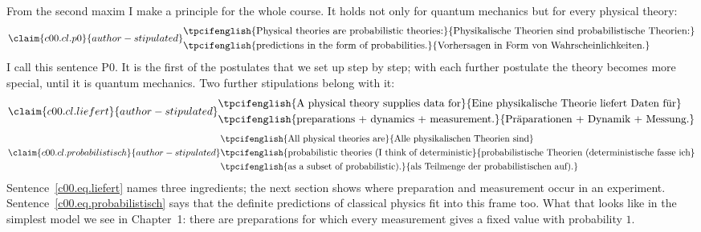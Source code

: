 From the second maxim I make a principle for the whole course. It holds not only for quantum
mechanics but for every physical theory:
\begin{equation}\label{c00.eq.p0}\claim{c00.cl.p0}{author-stipulated}
  \begin{aligned}
    &\text{\tpcifenglish{Physical theories are probabilistic theories:}{Physikalische Theorien sind probabilistische Theorien:}} \\
    &\text{\tpcifenglish{predictions in the form of probabilities.}{Vorhersagen in Form von Wahrscheinlichkeiten.}}
  \end{aligned}
\end{equation}
I call this sentence P0. It is the first of the postulates that we set up step by step; with
each further postulate the theory becomes more special, until it is quantum mechanics. Two
further stipulations belong with it:
\begin{equation}\label{c00.eq.liefert}\claim{c00.cl.liefert}{author-stipulated}
  \begin{aligned}
    &\text{\tpcifenglish{A physical theory supplies data for}{Eine physikalische Theorie liefert Daten für}} \\
    &\text{\tpcifenglish{preparations + dynamics + measurement.}{Präparationen + Dynamik + Messung.}}
  \end{aligned}
\end{equation}
\begin{equation}\label{c00.eq.probabilistisch}\claim{c00.cl.probabilistisch}{author-stipulated}
  \begin{aligned}
    &\text{\tpcifenglish{All physical theories are}{Alle physikalischen Theorien sind}} \\
    &\text{\tpcifenglish{probabilistic theories (I think of deterministic}{probabilistische Theorien (deterministische fasse ich}} \\
    &\text{\tpcifenglish{as a subset of probabilistic).}{als Teilmenge der probabilistischen auf).}}
  \end{aligned}
\end{equation}
Sentence~\eqref{c00.eq.liefert} names three ingredients; the next section shows where
preparation and measurement occur in an experiment. Sentence~\eqref{c00.eq.probabilistisch} says that the definite
predictions of classical physics fit into this frame too. What that looks like in the
simplest model we see in Chapter~1: there are preparations for which every measurement gives
a fixed value with probability $1$.

